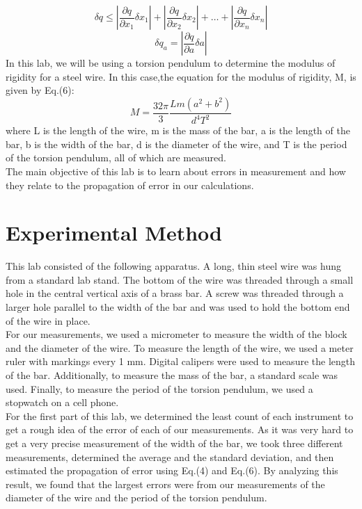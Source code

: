 \documentclass[leqno]{article}
\begin{document}
\begin{equation}
	\delta q \leq |\frac{\partial q}{\partial x_1}\delta x_1|+|\frac{\partial q}{\partial x_2}\delta x_2|+\ldots + |\frac{\partial q}{\partial x_n}\delta x_n|
\end{equation}
\begin{equation}
	\delta q_a=|\frac{\partial q}{\partial a}\delta a|
\end{equation}
In this lab, we will be using a torsion pendulum to determine the modulus of rigidity for a steel wire.
In this case,the equation for the modulus of rigidity, M, is given by Eq.(6):
\begin{equation}
	M=\frac{32\pi}{3}\frac{Lm(a^2+b^2)}{d^4T^2}
\end{equation}
where L is the length of the wire, m is the mass of the bar, a is the length of the bar, b is the width of the bar, d is the diameter of the wire, and T is the period of the torsion pendulum, all of which are measured.\\
The main objective of this lab is to learn about errors in measurement and how they relate to the propagation of error in our calculations.
\section*{Experimental Method}
This lab consisted of the following apparatus.  A long, thin steel wire was hung from a standard lab stand.  The bottom of the wire was threaded through a small hole in the central vertical axis of a brass bar.  A screw was threaded through a larger hole parallel to the width of the bar and was used to hold the bottom end of the wire in place.\\

\noindent For our measurements, we used a micrometer to measure the width of the block and the diameter of the wire.  To measure the length of the wire, we used a meter ruler with markings every 1 mm.  Digital calipers were used to measure the length of the bar.  Additionally, to measure the mass of the bar, a standard scale was used.  Finally, to measure the period of the torsion pendulum, we used a stopwatch on a cell phone.\\

\noindent For the first part of this lab, we determined the least count of each instrument to get a rough idea of the error of each of our measurements.  As it was very hard to get a very precise measurement of the width of the bar, we took three different measurements, determined the average and the standard deviation, and then estimated the propagation of error using Eq.(4) and Eq.(6).  By analyzing this result, we found that the largest errors were from our measurements of the diameter of the wire and the period of the torsion pendulum.\\
\end{document}
